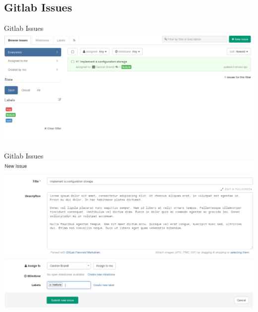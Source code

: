 \documentclass{beamer}
\begin{document}
\subsection{Gitlab Issues}
\begin{frame}{Gitlab Issues}
	\includegraphics[width=\textwidth]{images/gitlab_issues}
\end{frame}
\begin{frame}{Gitlab Issues}
	\includegraphics[width=\textwidth]{images/gitlab_new_issue}
\end{frame}
\end{document}
